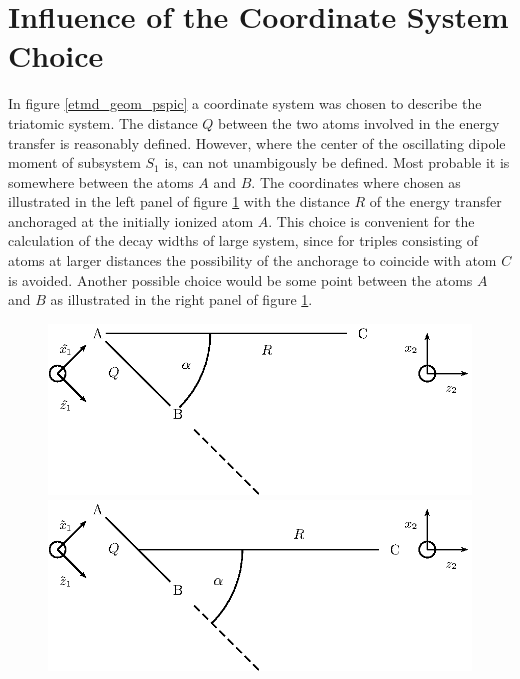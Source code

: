 \section{Influence of the Coordinate System Choice} \label{section:coord_choice}
In figure \ref{etmd_geom_pspic} a coordinate
system was chosen to describe the
triatomic system. The distance $Q$ between the two atoms involved
in the energy transfer is reasonably defined. However, where the
center of the oscillating dipole moment of subsystem $S_1$ is, can
not unambigously be defined. Most
probable it is somewhere between the atoms $A$ and $B$.
The coordinates where chosen as illustrated in the left panel of figure
\ref{figure:coord_etmd_comparison} with the distance $R$ of the energy transfer
anchoraged at the initially ionized atom $A$. This choice is convenient for
the calculation of the decay widths of large system, since for triples
consisting of atoms at larger distances the possibility of the anchorage to
coincide with atom $C$ is avoided.
Another possible choice would be some point between the atoms $A$ and $B$ as
illustrated in the right panel of figure \ref{figure:coord_etmd_comparison}.

\begin{figure}
 \centering
 \includegraphics[scale=0.7]{pics/coord_etmd_alt_pspic.eps}
 \hfill
 \includegraphics[scale=0.7]{pics/coord_etmd_pspic.eps}
 \caption{}
 \label{figure:coord_etmd_comparison}
\end{figure}

